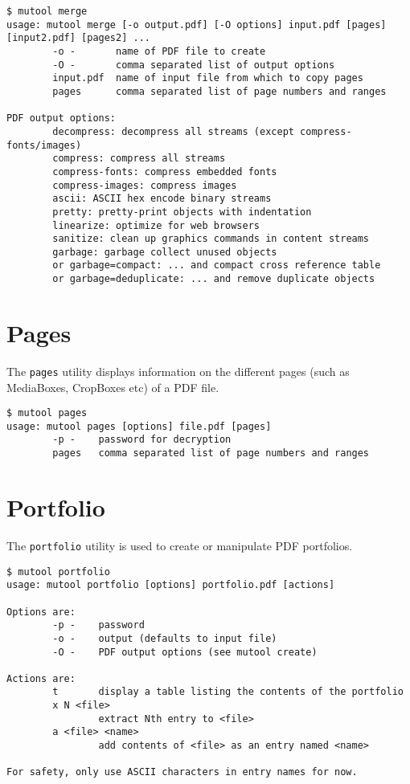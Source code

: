 \documentclass[oneside]{book}
\begin{document}
\begin{lstlisting}
$ mutool merge
usage: mutool merge [-o output.pdf] [-O options] input.pdf [pages] [input2.pdf] [pages2] ...
        -o -       name of PDF file to create
        -O -       comma separated list of output options
        input.pdf  name of input file from which to copy pages
        pages      comma separated list of page numbers and ranges

PDF output options:
        decompress: decompress all streams (except compress-fonts/images)
        compress: compress all streams
        compress-fonts: compress embedded fonts
        compress-images: compress images
        ascii: ASCII hex encode binary streams
        pretty: pretty-print objects with indentation
        linearize: optimize for web browsers
        sanitize: clean up graphics commands in content streams
        garbage: garbage collect unused objects
        or garbage=compact: ... and compact cross reference table
        or garbage=deduplicate: ... and remove duplicate objects
\end{lstlisting}

\section{Pages}

The \texttt{pages} utility displays information on the different pages (such as MediaBoxes, CropBoxes etc) of a PDF file.

\begin{lstlisting}
$ mutool pages
usage: mutool pages [options] file.pdf [pages]
        -p -    password for decryption
        pages   comma separated list of page numbers and ranges
\end{lstlisting}

\section{Portfolio}

The \texttt{portfolio} utility is used to create or manipulate PDF portfolios.

\begin{lstlisting}
$ mutool portfolio
usage: mutool portfolio [options] portfolio.pdf [actions]

Options are:
        -p -    password
        -o -    output (defaults to input file)
        -O -    PDF output options (see mutool create)

Actions are:
        t       display a table listing the contents of the portfolio
        x N <file>
                extract Nth entry to <file>
        a <file> <name>
                add contents of <file> as an entry named <name>

For safety, only use ASCII characters in entry names for now.
\end{lstlisting}
\end{document}
